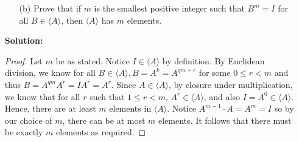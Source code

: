 \documentclass[letterpaper,12pt]{article}
\theoremstyle{definition}
\begin{document}
\pagebreak
\begin{enumerate}
    \item[] \begin{enumerate}
        \item[(b)] Prove that if $m$ is the smallest positive integer such that $B^m = I$ for all $B \in \langle A \rangle$, then $\langle A \rangle$ has $m$ elements.
    \end{enumerate}
    \begin{mdframed}
        \textbf{Solution:}
      \begin{proof}
            Let $m$ be as stated. Notice $I \in \langle A \rangle$ by definition. By Euclidean division, we know for all $B \in \langle A \rangle, B = A^k = A^{qm + r}$ for some $0 \leq r < m$ and thus $B = A^{qm}A^r = IA^r = A^{r}$. Since $A \in \langle A \rangle$, by closure under multiplication, we know that for all $r$ such that $1 \leq r < m$, $A^r \in \langle A \rangle$, and also $I = A^0 \in \langle A \rangle$. Hence, there are at least $m$ elements in $\langle A \rangle$. Notice $A^{m-1} \cdot A = A^m = I$ so by our choice of $m$, there can be at most $m$ elements. It follows that there must be exactly $m$ elements as required.
      \end{proof}
    \end{mdframed}
\end{enumerate}
\pagebreak
\end{document}
